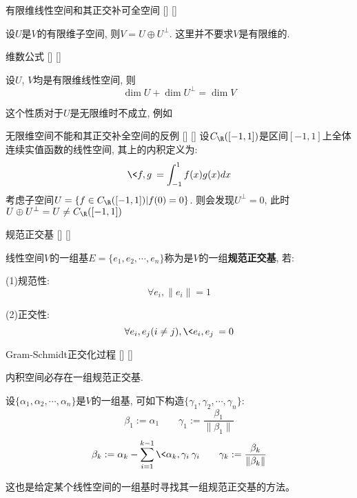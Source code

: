 \documentclass[UTF8]{ctexart}
\begin{document}
		

        \begin{ppt}
            []
            {有限维线性空间和其正交补可 全空间}
            []
            []
            
            设$U$是$V$的有限维子空间, 则$V=U\oplus U^{\perp}$. 这里并不要求$V$是有限维的.
        \end{ppt}
        
        \begin{ppt}
			[]
			{维数公式}
			[]
			[]
			
			设$U$, $V$均是有限维线性空间, 则
            \[\dim U+\dim U^{\perp}=\dim V\]
		\end{ppt}

        这个性质对于$U$是无限维时不成立, 例如
        \begin{cxmp}
            []
            {无限维空间不能和其正交补 全空间的反例}
            []
            []
            设$C_{\R}([-1,1])$是区间$[-1,1]$上全体连续实值函数的线性空间, 
            其上的内积定义为:
            \[\<f,g\>=\int_{-1}^{1}f(x)g(x)dx\]
            考虑子空间$U=\{f\in C_{\R}([-1,1])| f(0)=0\}$. 则会发现$U^{\perp}={0}$, 此时$U\oplus U^{\perp}=U\neq C_{\R}([-1,1])$
        \end{cxmp}
        
		\begin{dfn}
			[]
			{规范正交基}
			[]
			[]

			线性空间$V$的一组基$E=\{e_1,e_2,\cdots,e_n\}$称为是$V$的一组\textbf{规范正交基}, 若: 

			(1)规范性: 
			\[\forall e_i, \|e_i\|=1\]

			(2)正交性: 
			\[\forall e_i,e_j(i\neq j), \<e_i,e_j\>=0\]
		\end{dfn}
		
		\begin{thm}
			[]
			{Gram-Schmidt正交化过程}
			[]
			[]

			内积空间必存在一组规范正交基. 
		\end{thm}
		
		\begin{prf}
			设$\{\alpha_1,\alpha_2,\cdots,\alpha_n\}$是$V$的一组基, 可如下构造$\{\gamma_1,\gamma_2,\cdots,\gamma_n\}$: 
			\[\beta_1:=\alpha_1\qquad\gamma_1:=\frac{\beta_1}{\|\beta_1\|}\]
			\[\beta_k:=\alpha_k-\sum_{i=1}^{k-1}\<\alpha_k,\gamma_i\>\gamma_i\qquad\gamma_k:=\frac{\beta_k}{\|\beta_k\|}\]
		\end{prf}
		
		这也是给定某个线性空间的一组基时寻找其一组规范正交基的方法。
\end{document}
